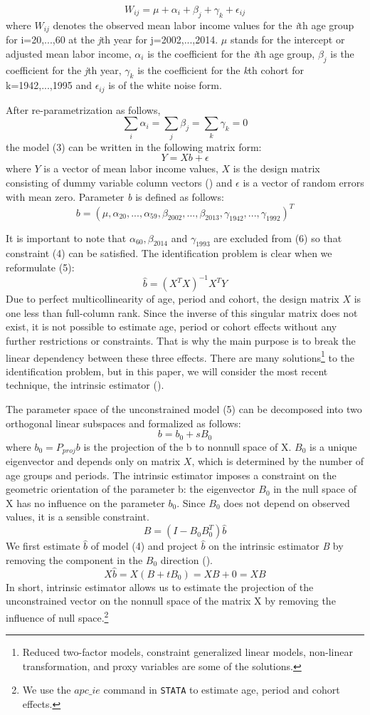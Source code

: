 \documentclass[12pt,author-year]{article}
\begin{document}
\[W_{ij}=\mu+\alpha_i+\beta_j+\gamma_k+\epsilon_{ij} \tag{3} \]
where $W_{ij}$ denotes the observed mean labor income values for the \textit{i}th age group for i=20,...,60 at the \textit{j}th year for j=2002,...,2014. $\mu$ stands for the intercept or adjusted mean labor income, $\alpha_i$ is the coefficient for the \textit{i}th age group, $\beta_j$ is the coefficient for the \textit{j}th year, $\gamma_k$ is the coefficient for the \textit{k}th cohort for k=1942,...,1995 and $\epsilon_{ij}$ is of the white noise form.

After re-parametrization as follows,
\[\sum_i \alpha_i = \sum_j \beta_j = \sum_k \gamma_k = 0 \tag{4} \]
the model (3) can be written in the following matrix form:
\[Y=Xb+\epsilon \tag{5} \]
where $Y$ is a vector of mean labor income values, $X$ is the design matrix consisting of dummy variable column vectors (\citealp{Yang}) and $\epsilon$ is a vector of random errors with mean zero. Parameter \textit{b} is defined as follows:
\[b=(\mu, \alpha_{20}, ..., \alpha_{59}, \beta_{2002}, ..., \beta_{2013}, \gamma_{1942}, ..., \gamma_{1992})^T \tag{6} \]

It is important to note that $\alpha_{60}, \beta_{2014}$ and $\gamma_{1993}$ are excluded from (6) so that constraint (4) can be satisfied. The identification problem is clear when we reformulate (5):
\[\hat{b}=(X^T X)^{-1} X^T Y \tag{7} \]
Due to perfect multicollinearity of age, period and cohort, the design matrix $X$ is one less than full-column rank. Since the inverse of this singular matrix does not exist, it is not possible to estimate age, period or cohort effects without any further restrictions or constraints. That is why the main purpose is to break the linear dependency between these three effects. There are many solutions\footnote{Reduced two-factor models, constraint generalized linear models, non-linear transformation, and proxy variables are some of the solutions.} to the identification problem, but in this paper, we will consider the most recent technique, the intrinsic estimator (\citealp{Yang2}).

The parameter space of the unconstrained model (5) can be decomposed into two orthogonal linear subspaces and formalized as follows:
\[b=b_0+sB_0 \tag{8} \]
where $b_0=P_{proj}b$ is the projection of the b to nonnull space of X. $B_0$ is a unique eigenvector and depends only on matrix $X$, which is determined by the number of age groups and periods. The intrinsic estimator imposes a constraint on the geometric orientation of the parameter b: the eigenvector $B_0$ in the null space of X has no influence on the parameter $b_0$. Since $B_0$ does not depend on observed values, it is a sensible constraint.
\[B=(I-B_0 B_0^T)\hat{b} \tag{9} \]
We first estimate $\hat{b}$ of model (4) and project $\hat{b}$ on the intrinsic estimator \textit{B} by removing the component in the $B_0$ direction (\citealp{Yang2}).
\[X\hat{b}=X(B+tB_0)=XB+0=XB \tag{10} \]
In short, intrinsic estimator allows us to estimate the projection of the unconstrained vector on the nonnull space of the matrix X by removing the influence of null space.\footnote{We use the $apc\_ie$ command in \texttt{STATA} to estimate age, period and cohort effects.}
\end{document}
